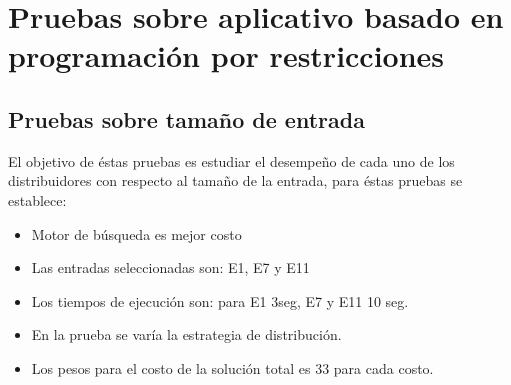 \section{Pruebas sobre aplicativo basado en programación por restricciones}

\subsection{Pruebas sobre tamaño de entrada}

El objetivo de éstas pruebas es estudiar el desempeño de cada uno de los distribuidores con respecto al tamaño de la entrada, para éstas pruebas se establece:

\begin{itemize}
	\item Motor de búsqueda es mejor costo
	\item Las entradas seleccionadas son: E1, E7 y E11
	\item Los tiempos de ejecución son: para E1 3seg, E7 y E11 10 seg.
	\item En la prueba se varía la estrategia de distribución.
	\item Los pesos para el costo de la solución total es 33 para cada costo.
\end{itemize}

